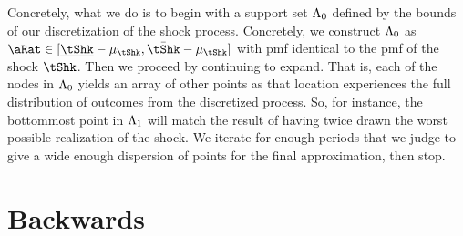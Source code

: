 \documentclass[\econtexRoot/BufferStockTheory.tex]{subfiles}
\begin{document}
Concretely, what we do is to begin with a support set $\Lambda_{0}$ defined by the bounds of our discretization of the shock process. Concretely, we construct $\Lambda_{0}$ as $\pnt \in [\Bot{\tShk}-\tShkMean,\Top{\tShk}-\tShkMean]$ with {pmf} identical to the {pmf} of the shock $\tShk$.  Then we proceed by continuing to expand.  That is, each of the nodes in $\Lambda_{0}$ yields an array of other points as that location experiences the full distribution of outcomes from the discretized process.  So, for instance, the bottommost point in $\Lambda_{1}$ will match the result of having twice drawn the worst possible realization of the shock.  We iterate for enough periods that we judge to give a wide enough dispersion of points for the final approximation, then stop.



\begin{comment}

  \begin{align}
         & = \left(\frac{1}{2}\right)\left(\erf(\Top{\SetPartCnts}_{\thisBin}-\Bot{\SetPartCnts}_{\thisBin})-\erf(\Bot{\SetPartCnts}_{\thisBin}-\Bot{\SetPartCnts}_{\thisBin})\right)
  \end{align}
\end{comment}

\begin{comment}
  Finally, for $a < b$ defining 
  \begin{align}
    \mathfrak{C}(a,b) & \equiv  \CDF^{\tShk}(b)-\CDF^{\tShk}(a)
  \end{align}

  so
  \begin{align}
    \TnsMrkv_{\thisBin,\thatBin} &= \int_{\Bot{\SetPartCnts}_{\thisBin}}^{\Top{\SetPartCnts}_{\thisBin}} \mathfrak{C}(\pnt-\underline{\pnt}_{\thatBin},\pnt-\bar{\pnt}_{\thatBin})d\CDF^{\pnt}
  \end{align}
\end{comment}

\section{Backwards}
\end{document}
